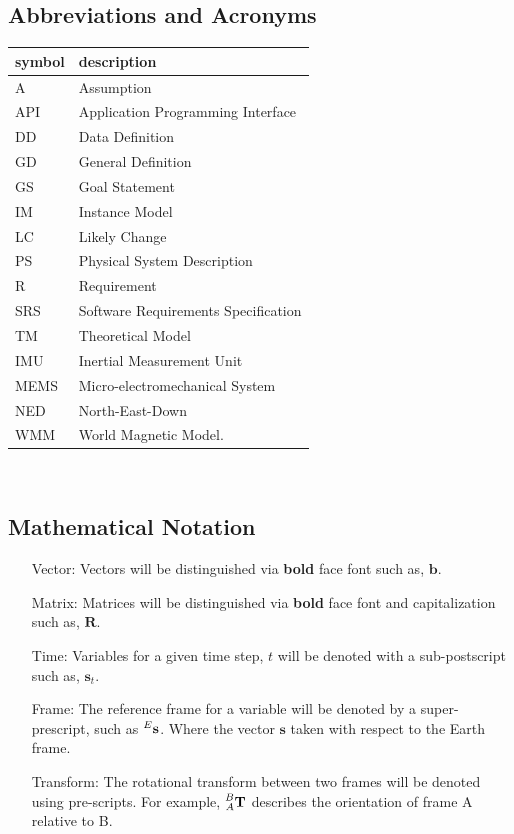 \documentclass[12pt]{article}
\begin{document}
\subsection{Abbreviations and Acronyms}

\renewcommand{\arraystretch}{1.2}
\begin{tabular}{l l} 
  \toprule		
  \textbf{symbol} & \textbf{description}\\
  \midrule 
  A & Assumption\\
  API & Application Programming Interface \\
  DD & Data Definition\\
  GD & General Definition\\
  GS & Goal Statement\\
  IM & Instance Model\\
  LC & Likely Change\\
  PS & Physical System Description\\
  R & Requirement\\
  SRS & Software Requirements Specification\\
  TM & Theoretical Model\\
  IMU & Inertial Measurement Unit\\
  MEMS & Micro-electromechanical System \\
  NED & North-East-Down \\
  WMM & World Magnetic Model. \\
  \bottomrule
\end{tabular}\\


\subsection{Mathematical Notation}

\begin{itemize}
  \item[Vector:] Vectors will be distinguished via \textbf{bold} face font such as, $\mathbf{b}$.
  \item[Matrix:] Matrices will be distinguished via \textbf{bold} face font and capitalization such
  as, $\mathbf{R}$.
  \item[Time:] Variables for a given time step, $t$ will be denoted with a sub-postscript such as,
  $\mathbf{s}_t$.
  \item[Frame:] The reference frame for a variable will be denoted by a super-prescript, such as
  $\prescript{E}{}{\mathbf{s}}$. Where the vector $\mathbf{s}$ taken with respect to the Earth
  frame.
  \item[Transform:] The rotational transform between two frames will be denoted using pre-scripts.
  For example, $\prescript{B}{A}{\mathbf{T}}$ describes the orientation of frame A relative to B.
\end{itemize}
\end{document}
